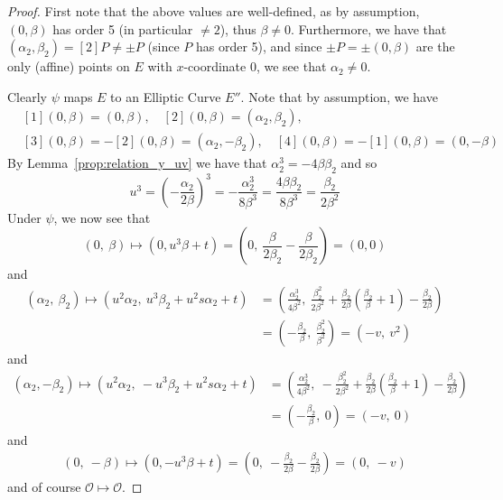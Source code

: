 \documentclass{scrartcl}
\renewcommand{\O}{\mathcal{O}}
\theoremstyle{definition}
\begin{document}
\begin{proof}
    First note that the above values are well-defined, as by assumption, $(0, \beta)$ has order 5 (in particular $\neq 2$), thus $\beta \neq 0$.
    Furthermore, we have that $(\alpha_2, \beta_2) = [2]P \neq \pm P$ (since $P$ has order 5), and since $\pm P = \pm (0, \beta)$ are the only (affine) points on $E$ with $x$-coordinate $0$, we see that $\alpha_2 \neq 0$.

    Clearly $\psi$ maps $E$ to an Elliptic Curve $E''$.
    Note that by assumption, we have
    \begin{align*}
        &[1](0, \beta) = (0, \beta), \quad [2](0, \beta) = (\alpha_2, \beta_2), \\
        &[3](0, \beta) = -[2](0, \beta) = (\alpha_2, -\beta_2), \quad [4](0, \beta) = -[1](0, \beta) = (0, -\beta)
    \end{align*}
    By Lemma~\ref{prop:relation_y_uv} we have that $\alpha_2^3 = -4\beta\beta_2$ and so
    \begin{equation*}
        u^3 = \left( -\frac {\alpha_2} {2\beta} \right)^3 = -\frac {\alpha_2^3} {8\beta^3} = \frac {4\beta\beta_2} {8\beta^3} = \frac {\beta_2} {2\beta^2}
    \end{equation*}
    Under $\psi$, we now see that
    \begin{equation*}
        (0, \ \beta) \mapsto (0, u^3 \beta + t) = \left( 0, \ \frac {\beta} {2\beta_2} - \frac {\beta} {2\beta_2} \right) = (0, 0)
    \end{equation*}
    and
    \begin{align*}
        (\alpha_2, \ \beta_2) \mapsto (u^2 \alpha_2, \ u^3 \beta_2 + u^2 s \alpha_2 + t) &= \left(\frac {\alpha_2^3} {4\beta^2}, \ \frac {\beta_2^2} {2\beta^2} + \frac {\beta_2} {2\beta} \left( \frac {\beta_2} {\beta} + 1 \right) - \frac {\beta_2} {2\beta} \right) \\
        &= \left( -\frac {\beta_2} {\beta}, \ \frac {\beta_2^2} {\beta^2} \right) = (-v, \ v^2)
    \end{align*}
    and
    \begin{align*}
        (\alpha_2, -\beta_2) \mapsto (u^2 \alpha_2, \ -u^3 \beta_2 + u^2 s \alpha_2 + t) &= \left(\frac {\alpha_2^3} {4\beta^2}, \ -\frac {\beta_2^2} {2\beta^2} + \frac {\beta_2} {2\beta} \left( \frac {\beta_2} {\beta} + 1 \right) - \frac {\beta_2} {2\beta} \right) \\
        &= ( -\frac {\beta_2} {\beta}, \ 0) = (-v, \ 0)
    \end{align*}
    and
    \begin{align*}
        (0, \ -\beta) \mapsto (0, -u^3 \beta + t) = \left( 0, \ -\frac {\beta_2} {2\beta} - \frac {\beta_2} {2\beta} \right) = (0, \ -v)
    \end{align*}
    and of course $\O \mapsto \O$.


\end{proof}
\end{document}
